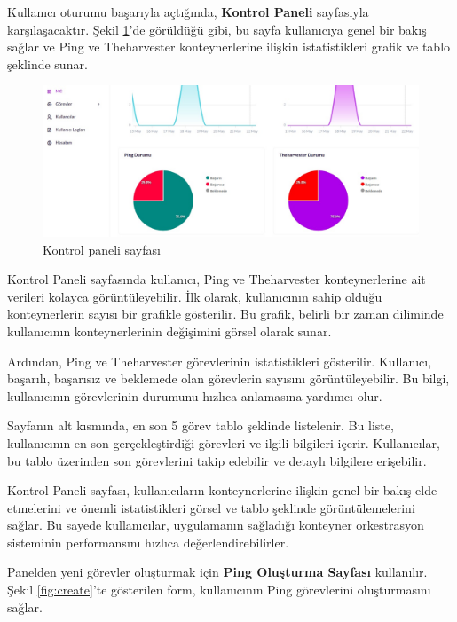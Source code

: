 Kullanıcı oturumu başarıyla açtığında, \textbf{Kontrol Paneli} sayfasıyla karşılaşacaktır. Şekil \ref{fig:dashboard}'de görüldüğü gibi, bu sayfa kullanıcıya genel bir bakış sağlar ve Ping ve Theharvester konteynerlerine ilişkin istatistikleri grafik ve tablo şeklinde sunar.

\begin{figure}[ht]
	\centering
	\includegraphics[width=0.9\linewidth]{images/dashboard.jpeg}
	\caption{Kontrol paneli sayfası}
	\label{fig:dashboard}
\end{figure}

Kontrol Paneli sayfasında kullanıcı, Ping ve Theharvester konteynerlerine ait verileri kolayca görüntüleyebilir. İlk olarak, kullanıcının sahip olduğu konteynerlerin sayısı bir grafikle gösterilir. Bu grafik, belirli bir zaman diliminde kullanıcının konteynerlerinin değişimini görsel olarak sunar.

Ardından, Ping ve Theharvester görevlerinin istatistikleri gösterilir. Kullanıcı, başarılı, başarısız ve beklemede olan görevlerin sayısını görüntüleyebilir. Bu bilgi, kullanıcının görevlerinin durumunu hızlıca anlamasına yardımcı olur.

Sayfanın alt kısmında, en son 5 görev tablo şeklinde listelenir. Bu liste, kullanıcının en son gerçekleştirdiği görevleri ve ilgili bilgileri içerir. Kullanıcılar, bu tablo üzerinden son görevlerini takip edebilir ve detaylı bilgilere erişebilir.

Kontrol Paneli sayfası, kullanıcıların konteynerlerine ilişkin genel bir bakış elde etmelerini ve önemli istatistikleri görsel ve tablo şeklinde görüntülemelerini sağlar. Bu sayede kullanıcılar, uygulamanın sağladığı konteyner orkestrasyon sisteminin performansını hızlıca değerlendirebilirler.

Panelden yeni görevler oluşturmak için \textbf{Ping Oluşturma Sayfası} kullanılır. Şekil \ref{fig:create}'te gösterilen form, kullanıcının Ping görevlerini oluşturmasını sağlar.

